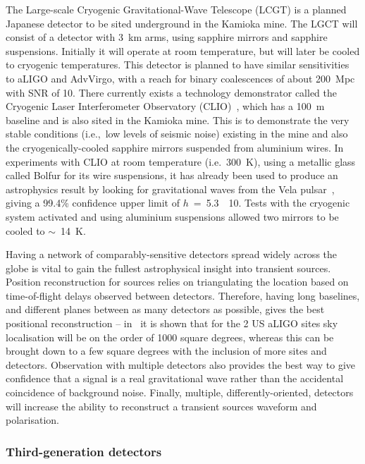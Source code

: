 \documentclass{article}
\begin{document}
The Large-scale Cryogenic Gravitational-Wave Telescope (LCGT)
\cite{Miyoki:2005, Ohashi:2008, Kuroda:2010} is a planned Japanese detector to
be sited underground in the Kamioka mine. The LGCT will consist of a detector
with 3~km arms, using sapphire mirrors and sapphire suspensions. Initially it
will operate at room temperature, but will later be cooled to cryogenic
temperatures. This detector is planned to have similar sensitivities
to aLIGO and AdvVirgo, with a reach for binary coalescences of about 200~Mpc
with SNR of 10. There currently exists a technology demonstrator called the
Cryogenic Laser Interferometer Observatory (CLIO)~\cite{Yamamoto:2008, CLIOweb},
which has a 100~m baseline and is also sited in the Kamioka mine. This is to
demonstrate the very stable conditions (i.e.,\ low levels of seismic noise)
existing in the mine and also the cryogenically-cooled sapphire mirrors
suspended from aluminium wires. In experiments with CLIO at room temperature
(i.e.\, 300~K), using a metallic glass called Bolfur for its wire suspensions, it
has already been used to produce an astrophysics result by looking for
gravitational waves from the Vela pulsar~\cite{Akutsu:2008}, giving a 99.4\%
confidence upper limit of $h$~=~5.3~\texttimes~10. Tests with the cryogenic
system activated and using aluminium suspensions allowed two mirrors to be
cooled to $\sim$~14~K.

Having a network of comparably-sensitive detectors spread widely across the
globe is vital to gain the fullest astrophysical insight into transient sources.
Position reconstruction for sources relies on triangulating the location based
on time-of-flight delays observed between detectors. Therefore, having long
baselines, and different planes between as many detectors as possible, gives the
best positional reconstruction -- in~\cite{Fairhurst:2010} it is shown that for
the 2 US aLIGO sites sky localisation will be on the order of 1000 square degrees,
whereas this can be brought down to a few square degrees with the inclusion of
more sites and detectors. Observation with multiple detectors also provides the
best way to give confidence that a signal is a real gravitational wave rather
than the accidental coincidence of background noise. Finally, multiple,
differently-oriented, detectors will increase the ability to reconstruct a
transient sources waveform and polarisation.

\subsubsection{Third-generation detectors}
\label{subsec:et}
\end{document}
